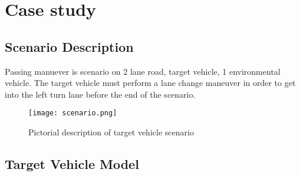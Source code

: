 \section{Case study}
\label{caseStudy}
\subsection{Scenario Description}
Passing manuever is scenario on 2 lane road, target vehicle, 1 environmental vehicle. The target vehicle must perform a lane change maneuver in order to get into the left turn lane before the end of the scenario.
\begin{figure}[tb]
	\label{fig:discreteview}
		\texttt{[image: scenario.png]}
	\caption{Pictorial description of target vehicle scenario}
\end{figure}
\subsection{Target Vehicle Model}
